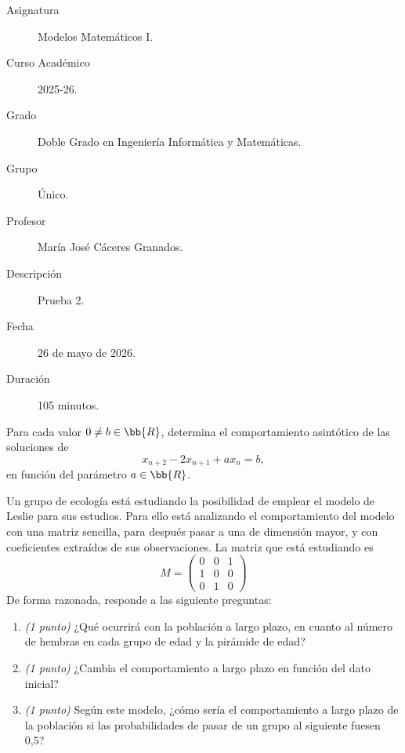 \documentclass[12pt]{article}
\begin{document}

    
    

    \begin{description}
        \item[Asignatura] Modelos Matemáticos I.
        \item[Curso Académico] 2025-26.
        \item[Grado] Doble Grado en Ingeniería Informática y Matemáticas.
        \item[Grupo] Único.
        \item[Profesor] María José Cáceres Granados.
        \item[Descripción] Prueba 2.
        \item[Fecha] 26 de mayo de 2026.
        \item[Duración] 105 minutos.
    
    \end{description}
    \newpage
    
    \begin{ejercicio}[4 puntos]Para cada valor $0 \ne b \in \bb{R}$, determina el comportamiento asintótico de las soluciones de
        \begin{equation}
            x_{n+2} - 2x_{n+1} + ax_n = b,
        \end{equation}
        en función del parámetro $a \in \bb{R}$.
    \end{ejercicio}

    \begin{ejercicio}Un grupo de ecología está estudiando la posibilidad de emplear el modelo de Leslie para sus estudios. Para ello está analizando el comportamiento del modelo con una matriz sencilla, para después pasar a una de dimensión mayor, y con coeficientes extraídos de sus observaciones. La matriz que está estudiando es
    $$M = \begin{pmatrix}
    0 & 0 & 1 \\
    1 & 0 & 0 \\
    0 & 1 & 0
    \end{pmatrix}$$
        De forma razonada, responde a las siguiente preguntas:
        \begin{enumerate}[label=\alph*)]
            \item \textit{(1 punto)} ¿Qué ocurrirá con la población a largo plazo, en cuanto al número de hembras en cada grupo de edad y la pirámide de edad?
            \item \textit{(1 punto)} ¿Cambia el comportamiento a largo plazo en función del dato inicial?
            \item \textit{(1 punto)} Según este modelo, ¿cómo sería el comportamiento a largo plazo de la población si las probabilidades de pasar de un grupo al siguiente fuesen 0,5?
        \end{enumerate}
    \end{ejercicio}
\end{document}
